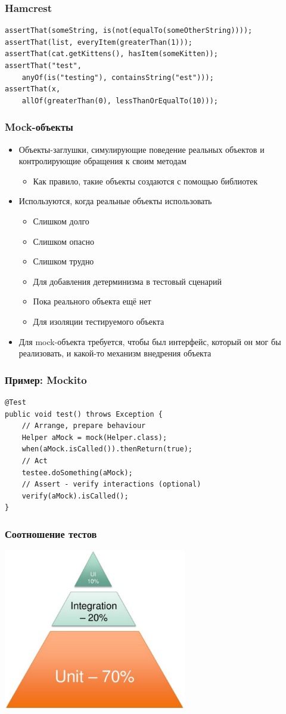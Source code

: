 \documentclass[xetex,mathserif,serif]{beamer}
\begin{document}
	\begin{frame}[fragile]
		\frametitle{Hamcrest}
		\begin{verbatim}
assertThat(someString, is(not(equalTo(someOtherString))));
assertThat(list, everyItem(greaterThan(1)));
assertThat(cat.getKittens(), hasItem(someKitten));
assertThat("test", 
    anyOf(is("testing"), containsString("est")));
assertThat(x, 
    allOf(greaterThan(0), lessThanOrEqualTo(10)));
		\end{verbatim}
	\end{frame}

	\begin{frame}
		\frametitle{Mock-объекты}
		\begin{itemize}
			\item Объекты-заглушки, симулирующие поведение реальных объектов и контролирующие обращения к своим методам
			\begin{itemize}
				\item Как правило, такие объекты создаются с помощью библиотек
			\end{itemize}
			\item Используются, когда реальные объекты использовать
			\begin{itemize}
				\item Слишком долго
				\item Слишком опасно
				\item Слишком трудно
				\item Для добавления детерминизма в тестовый сценарий
				\item Пока реального объекта ещё нет
				\item Для изоляции тестируемого объекта
			\end{itemize}
			\item Для mock-объекта требуется, чтобы был интерфейс, который он мог бы реализовать, и какой-то механизм внедрения объекта
		\end{itemize}
	\end{frame}

	\begin{frame}[fragile]
		\frametitle{Пример: Mockito}
		\begin{verbatim}
@Test
public void test() throws Exception {
    // Arrange, prepare behaviour
    Helper aMock = mock(Helper.class);
    when(aMock.isCalled()).thenReturn(true);
    // Act
    testee.doSomething(aMock);
    // Assert - verify interactions (optional)
    verify(aMock).isCalled();
}
		\end{verbatim}
	\end{frame}

	\begin{frame}
		\frametitle{Соотношение тестов}
		\begin{center}
			\includegraphics[width=0.6\textwidth]{testsProportions.png}
		\end{center}
	\end{frame}
\end{document}
